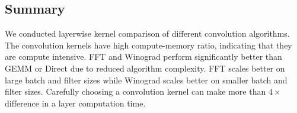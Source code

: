 \subsection{Summary}
We conducted layerwise kernel comparison of different convolution algorithms. The convolution kernels have high compute-memory ratio, indicating that they are compute intensive. \textsf{FFT} and \textsf{Winograd} perform significantly better than \textsf{GEMM} or \textsf{Direct} due to reduced algorithm complexity. \textsf{FFT} scales better on large batch and filter sizes while \textsf{Winograd} scales better on smaller batch and filter sizes. Carefully choosing a convolution kernel can make more than $4\times$ difference in a layer computation time. 